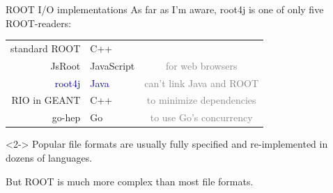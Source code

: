 \documentclass{beamer}
\begin{document}
\begin{frame}{ROOT I/O implementations}
\vspace{0.5 cm}
As far as I'm aware, root4j is one of only five ROOT-readers:

\begin{center}
\renewcommand{\arraystretch}{1.2}
\begin{tabular}{r | l c}
standard ROOT & C++ & \\
JsRoot        & JavaScript & \textcolor{gray}{for web browsers} \\
\textcolor{darkblue}{root4j}        & \textcolor{darkblue}{Java} & \textcolor{gray}{can't link Java and ROOT} \\
RIO in GEANT  & C++ & \textcolor{gray}{to minimize dependencies} \\
go-hep        & Go & \textcolor{gray}{to use Go's concurrency} \\
\end{tabular}
\end{center}

\vfill
\begin{uncoverenv}<2->
Popular file formats are usually fully specified and re-implemented in dozens of languages.

\vspace{0.25 cm}
But ROOT is much more complex than most file formats.
\end{uncoverenv}
\end{frame}









\end{document}
